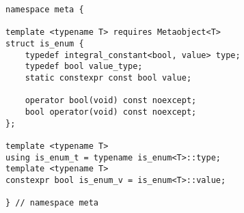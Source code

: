 
\begin{verbatim}
namespace meta {

template <typename T> requires Metaobject<T>
struct is_enum {
	typedef integral_constant<bool, value> type;
	typedef bool value_type;
	static constexpr const bool value;

	operator bool(void) const noexcept;
	bool operator(void) const noexcept;
};

template <typename T>
using is_enum_t = typename is_enum<T>::type;
template <typename T>
constexpr bool is_enum_v = is_enum<T>::value;

} // namespace meta
\end{verbatim}
